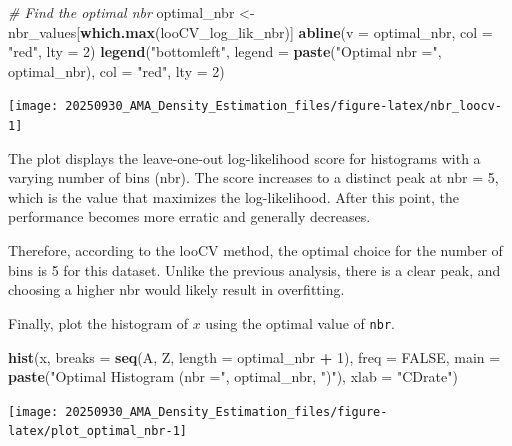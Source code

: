 \documentclass[
]{article}
\newenvironment{Shaded}{\begin{snugshade}}{\end{snugshade}}
\newcommand{\AttributeTok}[1]{\textcolor[rgb]{0.13,0.29,0.53}{#1}}
\newcommand{\CommentTok}[1]{\textcolor[rgb]{0.56,0.35,0.01}{\textit{#1}}}
\newcommand{\ConstantTok}[1]{\textcolor[rgb]{0.56,0.35,0.01}{#1}}
\newcommand{\DecValTok}[1]{\textcolor[rgb]{0.00,0.00,0.81}{#1}}
\newcommand{\FunctionTok}[1]{\textcolor[rgb]{0.13,0.29,0.53}{\textbf{#1}}}
\newcommand{\NormalTok}[1]{#1}
\newcommand{\OtherTok}[1]{\textcolor[rgb]{0.56,0.35,0.01}{#1}}
\newcommand{\SpecialCharTok}[1]{\textcolor[rgb]{0.81,0.36,0.00}{\textbf{#1}}}
\newcommand{\StringTok}[1]{\textcolor[rgb]{0.31,0.60,0.02}{#1}}
\begin{document}
\begin{Shaded}
\begin{Highlighting}[]
\CommentTok{\# Find the optimal nbr}
\NormalTok{optimal\_nbr }\OtherTok{\textless{}{-}}\NormalTok{ nbr\_values[}\FunctionTok{which.max}\NormalTok{(looCV\_log\_lik\_nbr)]}
\FunctionTok{abline}\NormalTok{(}\AttributeTok{v =}\NormalTok{ optimal\_nbr, }\AttributeTok{col =} \StringTok{"red"}\NormalTok{, }\AttributeTok{lty =} \DecValTok{2}\NormalTok{)}
\FunctionTok{legend}\NormalTok{(}\StringTok{"bottomleft"}\NormalTok{, }\AttributeTok{legend =} \FunctionTok{paste}\NormalTok{(}\StringTok{"Optimal nbr ="}\NormalTok{, optimal\_nbr), }\AttributeTok{col =} \StringTok{"red"}\NormalTok{, }\AttributeTok{lty =} \DecValTok{2}\NormalTok{)}
\end{Highlighting}
\end{Shaded}

\begin{center}\texttt{[image: 20250930\_AMA\_Density\_Estimation\_files/figure-latex/nbr\_loocv-1]} \end{center}

The plot displays the leave-one-out log-likelihood score for histograms
with a varying number of bins (nbr). The score increases to a distinct
peak at nbr = 5, which is the value that maximizes the log-likelihood.
After this point, the performance becomes more erratic and generally
decreases.

Therefore, according to the looCV method, the optimal choice for the
number of bins is 5 for this dataset. Unlike the previous analysis,
there is a clear peak, and choosing a higher nbr would likely result in
overfitting.

Finally, plot the histogram of \(x\) using the optimal value of
\texttt{nbr}.

\begin{Shaded}
\begin{Highlighting}[]
\FunctionTok{hist}\NormalTok{(x, }\AttributeTok{breaks =} \FunctionTok{seq}\NormalTok{(A, Z, }\AttributeTok{length =}\NormalTok{ optimal\_nbr }\SpecialCharTok{+} \DecValTok{1}\NormalTok{), }\AttributeTok{freq =} \ConstantTok{FALSE}\NormalTok{,}
     \AttributeTok{main =} \FunctionTok{paste}\NormalTok{(}\StringTok{"Optimal Histogram (nbr ="}\NormalTok{, optimal\_nbr, }\StringTok{")"}\NormalTok{),}
     \AttributeTok{xlab =} \StringTok{"CDrate"}\NormalTok{)}
\end{Highlighting}
\end{Shaded}

\begin{center}\texttt{[image: 20250930\_AMA\_Density\_Estimation\_files/figure-latex/plot\_optimal\_nbr-1]} \end{center}
\end{document}
